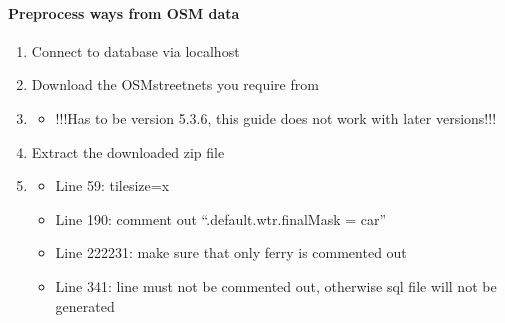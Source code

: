 \documentclass[letterpaper,10pt,english]{sphinxmanual}
\begin{document}
\paragraph{Preprocess ways from OSM data}
\label{\detokenize{docs_pylovo/installation:preprocess-ways-from-osm-data}}\begin{enumerate}
%
\item {} 
\sphinxAtStartPar
Connect to database via localhost

\item {} 
\sphinxAtStartPar
Download the OSM\sphinxhyphen{}streetnets you require from 

\item {} \begin{description}
\begin{itemize}
\item {} 
\sphinxAtStartPar
!!!Has to be version 5.3.6, this guide does not work with later versions!!!

\end{itemize}

\end{description}

\item {} 
\sphinxAtStartPar
Extract the downloaded zip file

\item {} \begin{description}
\begin{itemize}
\item {} 
\sphinxAtStartPar
Line 59:          tilesize=x

\item {} 
\sphinxAtStartPar
Line 190:         comment out “.default.wtr.finalMask = car”

\item {} 
\sphinxAtStartPar
Line 222\sphinxhyphen{}231:     make sure that only ferry is commented out

\item {} 
\sphinxAtStartPar
Line 341:         line must not be commented out, otherwise sql file will not be generated

\end{itemize}


\end{description}
\end{enumerate}
\end{document}
